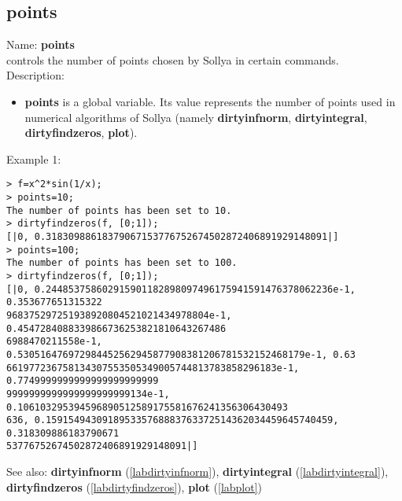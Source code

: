 \subsection{points}
\label{labpoints}
\noindent Name: \textbf{points}\\
controls the number of points chosen by Sollya in certain commands.\\

\noindent Description: \begin{itemize}

\item \textbf{points} is a global variable. Its value represents the number of points
   used in numerical algorithms of Sollya (namely \textbf{dirtyinfnorm},
   \textbf{dirtyintegral}, \textbf{dirtyfindzeros}, \textbf{plot}).
\end{itemize}
\noindent Example 1: 
\begin{center}\begin{minipage}{15cm}\begin{Verbatim}[frame=single]
> f=x^2*sin(1/x);
> points=10;
The number of points has been set to 10.
> dirtyfindzeros(f, [0;1]);
[|0, 0.31830988618379067153776752674502872406891929148091|]
> points=100;
The number of points has been set to 100.
> dirtyfindzeros(f, [0;1]);
[|0, 0.244853758602915901182898097496175941591476378062236e-1, 0.353677651315322
968375297251938920804521021434978804e-1, 0.4547284088339866736253821810643267486
6988470211558e-1, 0.530516476972984452562945877908381206781532152468179e-1, 0.63
661977236758134307553505349005744813783858296183e-1, 0.7749999999999999999999999
9999999999999999999999134e-1, 0.106103295394596890512589175581676241356306430493
636, 0.159154943091895335768883763372514362034459645740459, 0.318309886183790671
53776752674502872406891929148091|]
\end{Verbatim}
\end{minipage}\end{center}
See also: \textbf{dirtyinfnorm} (\ref{labdirtyinfnorm}), \textbf{dirtyintegral} (\ref{labdirtyintegral}), \textbf{dirtyfindzeros} (\ref{labdirtyfindzeros}), \textbf{plot} (\ref{labplot})

